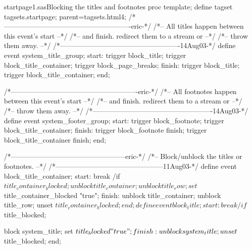 \begin{fvcode}{startpage1.sas}{Blocking the titles and footnotes}
proc template;
     define tagset tagsets.startpage;
         parent=tagsets.html4;
        /*-------------------------------------------------------eric-*/
        /*-- All titles happen between this event's start           --*/
        /*-- and finish.  redirect them to a stream or              --*/
        /*-- throw them away.                                       --*/
        /*----------------------------------------------------14Aug03-*/
        define event system_title_group;
            start:
                trigger block_title;
                trigger block_title_container;
                trigger block_page_breaks;
            finish:
                trigger block_title;
                trigger block_title_container;
        end;
        
        
        /*-------------------------------------------------------eric-*/
        /*-- All footnotes happen between this event's start        --*/
        /*-- and finish.  redirect them to a stream or              --*/
        /*-- throw them away.                                       --*/
        /*----------------------------------------------------14Aug03-*/
        define event system_footer_group;
            start:
                trigger block_footnote;
                trigger block_title_container;
            finish:
                trigger block_footnote finish;
                trigger block_title_container finish;
        end;
            
        /*--------------------------------------------------eric-*/
        /*-- Block/unblock the titles or footnotes.            --*/
        /*-----------------------------------------------11Aug03-*/
        define event block_title_container;
            start:
                break /if $title_container_blocked;
 
                unblock title_container;
                unblock title_row;
                set $title_container_blocked "true";
             finish:
                unblock title_container;
                unblock title_row;
                unset $title_container_blocked;
        end;
         

        define event block_title;
            start:
                break /if $title_blocked;
 
                block system_title;
                set $title_blocked "true";
            finish:
                unblock system_title;
                unset $title_blocked;
        end;


\end{fvcode}
